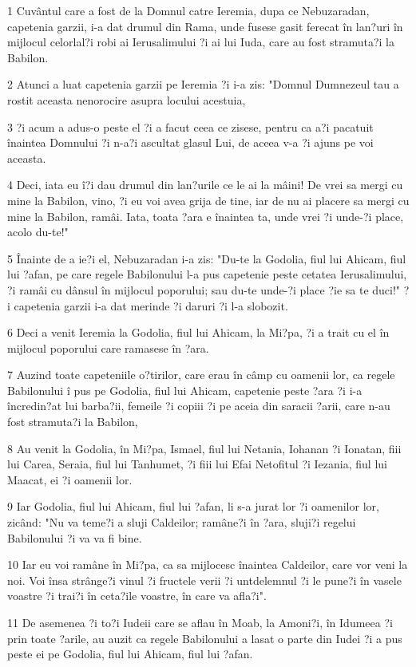 \par 1 Cuvântul care a fost de la Domnul catre Ieremia, dupa ce Nebuzaradan, capetenia garzii, i-a dat drumul din Rama, unde fusese gasit ferecat în lan?uri în mijlocul celorlal?i robi ai Ierusalimului ?i ai lui Iuda, care au fost stramuta?i la Babilon.
\par 2 Atunci a luat capetenia garzii pe Ieremia ?i i-a zis: "Domnul Dumnezeul tau a rostit aceasta nenorocire asupra locului acestuia,
\par 3 ?i acum a adus-o peste el ?i a facut ceea ce zisese, pentru ca a?i pacatuit înaintea Domnului ?i n-a?i ascultat glasul Lui, de aceea v-a ?i ajuns pe voi aceasta.
\par 4 Deci, iata eu î?i dau drumul din lan?urile ce le ai la mâini! De vrei sa mergi cu mine la Babilon, vino, ?i eu voi avea grija de tine, iar de nu ai placere sa mergi cu mine la Babilon, ramâi. Iata, toata ?ara e înaintea ta, unde vrei ?i unde-?i place, acolo du-te!"
\par 5 Înainte de a ie?i el, Nebuzaradan i-a zis: "Du-te la Godolia, fiul lui Ahicam, fiul lui ?afan, pe care regele Babilonului l-a pus capetenie peste cetatea Ierusalimului, ?i ramâi cu dânsul în mijlocul poporului; sau du-te unde-?i place ?ie sa te duci!" ?i capetenia garzii i-a dat merinde ?i daruri ?i l-a slobozit.
\par 6 Deci a venit Ieremia la Godolia, fiul lui Ahicam, la Mi?pa, ?i a trait cu el în mijlocul poporului care ramasese în ?ara.
\par 7 Auzind toate capeteniile o?tirilor, care erau în câmp cu oamenii lor, ca regele Babilonului î pus pe Godolia, fiul lui Ahicam, capetenie peste ?ara ?i i-a încredin?at lui barba?ii, femeile ?i copiii ?i pe aceia din saracii ?arii, care n-au fost stramuta?i la Babilon,
\par 8 Au venit la Godolia, în Mi?pa, Ismael, fiul lui Netania, Iohanan ?i Ionatan, fiii lui Carea, Seraia, fiul lui Tanhumet, ?i fiii lui Efai Netofitul ?i Iezania, fiul lui Maacat, ei ?i oamenii lor.
\par 9 Iar Godolia, fiul lui Ahicam, fiul lui ?afan, li s-a jurat lor ?i oamenilor lor, zicând: "Nu va teme?i a sluji Caldeilor; ramâne?i în ?ara, sluji?i regelui Babilonului ?i va va fi bine.
\par 10 Iar eu voi ramâne în Mi?pa, ca sa mijlocesc înaintea Caldeilor, care vor veni la noi. Voi însa strânge?i vinul ?i fructele verii ?i untdelemnul ?i le pune?i în vasele voastre ?i trai?i în ceta?ile voastre, în care va afla?i".
\par 11 De asemenea ?i to?i Iudeii care se aflau în Moab, la Amoni?i, în Idumeea ?i prin toate ?arile, au auzit ca regele Babilonului a lasat o parte din Iudei ?i a pus peste ei pe Godolia, fiul lui Ahicam, fiul lui ?afan.
